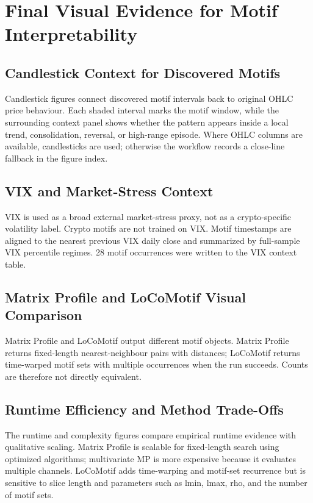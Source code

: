 \section{Final Visual Evidence for Motif Interpretability}

\subsection{Candlestick Context for Discovered Motifs}
Candlestick figures connect discovered motif intervals back to original OHLC price behaviour. Each shaded interval marks the motif window, while the surrounding context panel shows whether the pattern appears inside a local trend, consolidation, reversal, or high-range episode. Where OHLC columns are available, candlesticks are used; otherwise the workflow records a close-line fallback in the figure index.

\subsection{VIX and Market-Stress Context}
VIX is used as a broad external market-stress proxy, not as a crypto-specific volatility label. Crypto motifs are not trained on VIX. Motif timestamps are aligned to the nearest previous VIX daily close and summarized by full-sample VIX percentile regimes. 28 motif occurrences were written to the VIX context table.

\subsection{Matrix Profile and LoCoMotif Visual Comparison}
Matrix Profile and LoCoMotif output different motif objects. Matrix Profile returns fixed-length nearest-neighbour pairs with distances; LoCoMotif returns time-warped motif sets with multiple occurrences when the run succeeds. Counts are therefore not directly equivalent. 

\subsection{Runtime Efficiency and Method Trade-Offs}
The runtime and complexity figures compare empirical runtime evidence with qualitative scaling. Matrix Profile is scalable for fixed-length search using optimized algorithms; multivariate MP is more expensive because it evaluates multiple channels. LoCoMotif adds time-warping and motif-set recurrence but is sensitive to slice length and parameters such as lmin, lmax, rho, and the number of motif sets.
